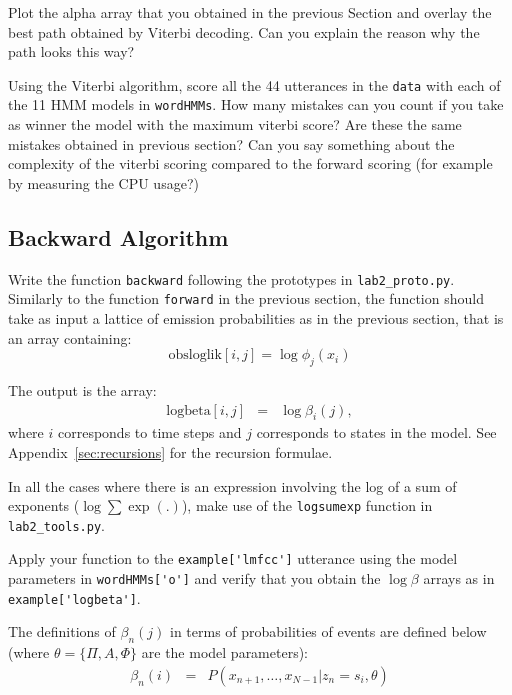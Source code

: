 \documentclass{nada-ten}
\begin{document}
Plot the alpha array that you obtained in the previous Section and overlay the best path obtained by Viterbi decoding. Can you explain the reason why the path looks this way?

Using the Viterbi algorithm, score all the 44 utterances in the \texttt{data} with each of the 11 HMM models in \texttt{wordHMMs}. How many mistakes can you count if you take as winner the model with the maximum viterbi score? Are these the same mistakes obtained in previous section? Can you say something about the complexity of the viterbi scoring compared to the forward scoring (for example by measuring the CPU usage?)

\subsection{Backward Algorithm}
Write the function \texttt{backward} following the prototypes in \texttt{lab2\_proto.py}. Similarly to the function \texttt{forward} in the previous section, the function should take as input a lattice of emission probabilities as in the previous section, that is an array containing:
$$ \mbox{obsloglik}[i,j] = \log \phi_j(x_i) $$

The output is the array:
\begin{eqnarray*}
  \mbox{logbeta}[i,j] &=& \log\beta_i(j),
\end{eqnarray*}
where $i$ corresponds to time steps and $j$ corresponds to states in the model. See Appendix~\ref{sec:recursions} for the recursion formulae.

In all the cases where there is an expression involving the log of a sum of exponents ($\log\sum\exp(.)$), make use of the \texttt{logsumexp} function in \texttt{lab2\_tools.py}.

Apply your function to the \verb|example['lmfcc']| utterance using the model parameters in \verb|wordHMMs['o']| and verify that you obtain the $\log\beta$ arrays as in \verb|example['logbeta']|.

The definitions of $\beta_n(j)$ in terms of probabilities of events are defined below (where $\theta = \{\Pi, A, \Phi\}$ are the model parameters):
\begin{eqnarray*}
  \beta_n(i) &=& P(x_{n+1}, \dots, x_{N-1}|z_n=s_i, \theta)
\end{eqnarray*}
\end{document}
